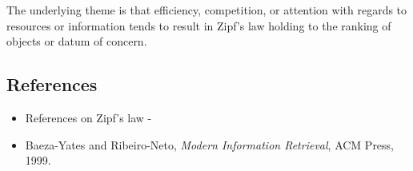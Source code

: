\documentclass[12pt]{article}
\begin{document}
The underlying theme is that efficiency, competition, or attention with regards to resources or information tends to result in Zipf's law holding to the ranking of objects or datum of concern.

\subsection{References}

\begin{itemize}

 \item References on Zipf's law - 

 \item Baeza-Yates and Ribeiro-Neto, \emph{Modern Information Retrieval}, ACM Press, 1999.

\end{itemize}
\end{document}
